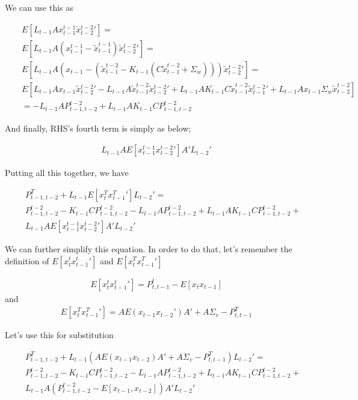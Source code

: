 \documentclass[12pt]{report}
\begin{document}
We can use this as

\begin{eqnarray*}
&& E[L_{t-1}Ax_{t-1}^{t-1}\tilde{x}{_{t-2}^{t-2}}'] = \\
&& E[L_{t-1}A(x_{t-1}^{t-1} - \tilde{x}_{t-1}^{t-1} )\tilde{x}{_{t-2}^{t-2}}'] = \\
&& E[L_{t-1}A(x_{t-1} - (\tilde{x}_{t-1}^{t-2} - K_{t-1}(C\tilde{x}_{t-1}^{t-2}
    + \Sigma_w ))) \tilde{x}{_{t-2}^{t-2}}'] = \\
&& E[L_{t-1}Ax_{t-1}\tilde{x}{_{t-2}^{t-2}}' - 
    L_{t-1}A\tilde{x}_{t-1}^{t-2}\tilde{x}{_{t-2}^{t-2}}' +
    L_{t-1}A K_{t-1} C \tilde{x}_{t-1}^{t-2} \tilde{x}{_{t-1}^{t-2}}' +
    L_{t-1}A x_{t-1} \Sigma_w \tilde{x}_{t-2}^{t-2} ] \\
&& = -L_{t-1}AP_{t-1,t-2}^{t-2} + L_{t-1}A K_{t-1}CP_{t-1,t-2}^{t-2}
\end{eqnarray*}

And finally, RHS's fourth term is simply as below;

\begin{eqnarray*}
L_{t-1}A E[x_{t-1}^{t-1}x{_{t-2}^{t-2}}']A'L_{t-2}'
\end{eqnarray*}

Putting all this together, we have

\begin{eqnarray*}
&& P_{t-1,t-2}^T + L_{t-1}E[x_t^Tx{_{t-1}^T}']L_{t-2}' = \\
&& P_{t-1,t-2}^{t-2} - K_{t-1} C P_{t-1,t-2}^{t-2} -
L_{t-1}AP_{t-1,t-2}^{t-2} + 
L_{t-1}A K_{t-1}CP_{t-1,t-2}^{t-2} +\\
&& L_{t-1}A E[x_{t-1}^{t-1}x{_{t-2}^{t-2}}']A'L_{t-2}'
\end{eqnarray*}

We can further simplify this equation. In order to do that, let's remember the
definition of $E[x_t^tx{_{t-1}^t}']$ and $E[x_t^Tx{_{t-1}^T}']$

\begin{eqnarray*}
E[x_t^tx{_{t-1}^t}'] = P_{t,t-1}^t - E[x_tx_{t-1}]
\end{eqnarray*}
and
\begin{eqnarray*}
E[x_t^Tx{_{t-1}^T}'] = AE(x_{t-1}x_{t-2}')A' + A\Sigma_v - P_{t,t-1}^T
\end{eqnarray*}

Let's use this for substitution

\begin{eqnarray*}
&& P_{t-1,t-2}^T + L_{t-1}(A E(x_{t-1}x_{t-2})A' + A\Sigma_v - P_{t,t-1}^T ) L_{t-2}' = \\
&& P_{t-1,t-2}^{t-2} - K_{t-1} C P_{t-1,t-2}^{t-2} -
L_{t-1}AP_{t-1,t-2}^{t-2} + 
L_{t-1}A K_{t-1}CP_{t-1,t-2}^{t-2} + \\
&& L_{t-1}A (P_{t-1,t-2}^{t-2} - E[x_{t-1},x_{t-2}])A'L_{t-2}' 
\end{eqnarray*}
\end{document}
